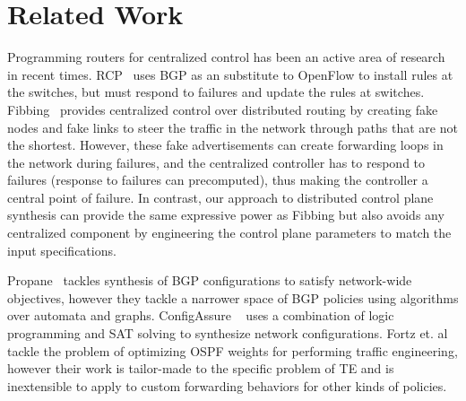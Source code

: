 \section{Related Work}
\label{sec:related}

Programming routers for centralized control has been an
active area of research in recent times. RCP~\cite{rcp} uses
BGP as an substitute to OpenFlow to install rules at the 
switches, but must respond to failures and update the 
rules at switches. Fibbing~\cite{fibbing} provides 
centralized control over distributed routing by creating 
fake nodes and fake links to steer the traffic in the 
network through paths that are not the shortest. However, 
these fake advertisements can create forwarding loops in the
network during failures, and the centralized controller 
has to respond to failures (response to failures can precomputed),
thus making the controller a central point of failure. In contrast,
our approach to distributed control plane synthesis can provide
the same expressive power as Fibbing but also
avoids any centralized component by engineering 
the control plane parameters to match the input specifications. 

 Propane~\cite{propane} 
tackles synthesis of BGP configurations to satisfy network-wide
objectives, however they tackle a narrower space of BGP policies
using algorithms over automata and graphs. ConfigAssure
~\cite{configassure} uses a combination of 
logic programming and SAT solving to synthesize network
configurations. Fortz et. al~\cite{ospf-te} tackle the 
problem of optimizing OSPF weights for performing traffic
engineering, however their work is tailor-made to the 
specific problem of TE and is inextensible to apply 
to custom forwarding behaviors for other kinds of policies.

